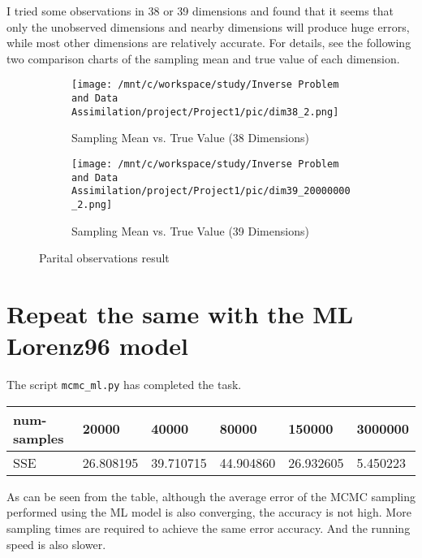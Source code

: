 \documentclass[11pt,reqno]{amsart}
\begin{document}
I tried some observations in 38 or 39 dimensions and found that it seems that only the unobserved dimensions and nearby dimensions will produce huge errors, while most other dimensions are relatively accurate. For details, see the following two comparison charts of the sampling mean and true value of each dimension.
\begin{figure}[H]
\begin{subfigure}[h]{0.45\textwidth}
  \centering
  \texttt{[image: /mnt/c/workspace/study/Inverse Problem and Data Assimilation/project/Project1/pic/dim38\_2.png]} %
 \caption{Sampling Mean vs. True Value (38 Dimensions)}
  \label{fig:mean-vs-true-38d}
\end{subfigure}
\hfill
\begin{subfigure}[h]{0.45\textwidth}
  \centering
  \texttt{[image: /mnt/c/workspace/study/Inverse Problem and Data Assimilation/project/Project1/pic/dim39\_20000000\_2.png]} %
  \caption{Sampling Mean vs. True Value (39 Dimensions)}
  \label{fig:mean-vs-true-39d}
\end{subfigure}
\caption{Parital observations result}
\label{fig:part_obs_distribution-comparison}
\end{figure}

\section{Repeat the same with the ML Lorenz96 model}

The script \verb|mcmc_ml.py| has completed the task.

\begin{table}[H]
  \begin{tabular}{|l|l|l|l|l|l|}
  \hline
  num-samples & 20000            & 40000            & 80000             & 150000             & 3000000            \\ \hline
  SSE         & 26.808195 & 39.710715 & 44.904860 & 26.932605 & 5.450223 \\ \hline
  \end{tabular}
\end{table}

As can be seen from the table, although the average error of the MCMC sampling performed using the ML model is also converging, the accuracy is not high. More sampling times are required to achieve the same error accuracy. And the running speed is also slower.
\end{document}
